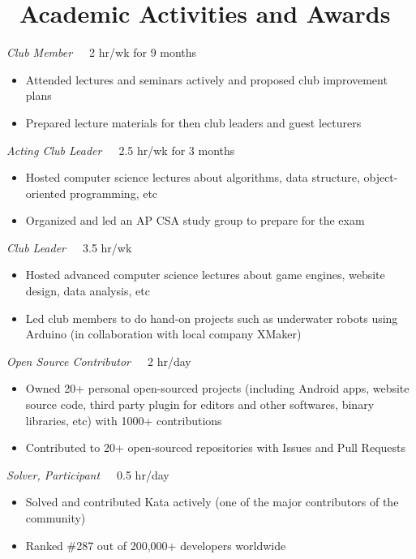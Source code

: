 \documentclass{resume}
\begin{document}
\section{\faCogs\ Academic Activities and Awards}
\emph{Club Member}\ \ \ 2 hr/wk for 9 months
\begin{itemize} 
  \item Attended lectures and seminars actively and proposed club improvement plans
  \item Prepared lecture materials for then club leaders and guest lecturers
\end{itemize}
\emph{Acting Club Leader}\ \ \ 2.5 hr/wk for 3 months
\begin{itemize}
  \item Hosted computer science lectures about algorithms, data structure, object-oriented programming, etc
  \item Organized and led an AP CSA study group to prepare for the exam
\end{itemize}
\emph{Club Leader}\ \ \ 3.5 hr/wk
\begin{itemize}
  \item Hosted advanced computer science lectures about game engines, website design, data analysis, etc
  \item Led club members to do hand-on projects such as underwater robots using Arduino (in collaboration with local company XMaker)
\end{itemize}

\emph{Open Source Contributor}\ \ \ 2 hr/day
\begin{itemize}
  \item Owned 20+ personal open-sourced projects (including Android apps, website source code, third party plugin for editors and other softwares, binary libraries, etc) with 1000+ contributions
  \item Contributed to 20+ open-sourced repositories with Issues and Pull Requests
\end{itemize}

\emph{Solver, Participant}\ \ \ 0.5 hr/day
\begin{itemize}
  \item Solved and contributed Kata actively (one of the major contributors of the community)
  \item Ranked \#287 out of 200,000+ developers worldwide
\end{itemize}
\end{document}
